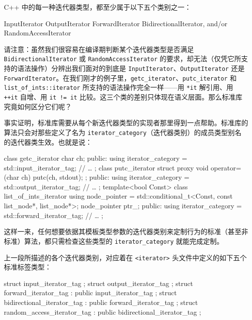 C++ 中的每一种迭代器类型，都至少属于以下五个类别之一：

\begin{codebox}[cpp]
InputIterator
OutputIterator
ForwardIterator
BidirectionalIterator, and/or
RandomAccessIterator
\end{codebox}

请注意：虽然我们很容易在编译期判断某个迭代器类型是否满足 \texttt{Bidirectional\allowbreak{}Iterator} 或 \texttt{Random\allowbreak{}Access\allowbreak{}Iterator} 的要求，却无法（仅凭它所支持的语法操作）分辨出我们面对的到底是 \texttt{Input\allowbreak{}Iterator}、\texttt{Output\allowbreak{}Iterator} 还是 \texttt{Forward\allowbreak{}Iterator}。在我们刚才的例子里，\texttt{getc\_\allowbreak{}iterator}、\texttt{putc\_\allowbreak{}iterator} 和 \texttt{list\_\allowbreak{}of\_\allowbreak{}ints::\allowbreak{}iterator} 所支持的语法操作完全一样——用 \texttt{*it} 解引用、用 \texttt{++it} 自增、用 \texttt{it != it} 比较。这三个类的差别只体现在语义层面。那么标准库究竟如何区分它们呢？

事实证明，标准库需要从每个新迭代器类型的实现者那里得到一点帮助。标准库的算法只会对那些定义了名为 \texttt{iterator\_\allowbreak{}category}（迭代器类别）的成员类型别名的迭代器类生效。也就是说：

\begin{codebox}[cpp]
    class getc_iterator {
      char ch;
    public:
      using iterator_category = std::input_iterator_tag;
      // …
    };
    class putc_iterator {
      struct proxy {
        void operator= (char ch) { putc(ch, stdout); }
      };
    public:
      using iterator_category = std::output_iterator_tag;
      // …
    };
    template<bool Const>
    class list_of_ints_iterator {
      using node_pointer = std::conditional_t<Const, const list_node*,
       list_node*>;
      node_pointer ptr_;
    public:
      using iterator_category = std::forward_iterator_tag;
      // …
    };
\end{codebox}

这样一来，任何想要依据其模板类型参数的迭代器类别来定制行为的标准（甚至非标准）算法，都只需检查这些类型的 \texttt{iterator\_\allowbreak{}category} 就能完成定制。

上一段所描述的各个迭代器类别，对应着在 \texttt{<iterator>\allowbreak{}} 头文件中定义的如下五个标准标签类型：

\begin{codebox}[cpp]
    struct input_iterator_tag { };
    struct output_iterator_tag { };
    struct forward_iterator_tag : public input_iterator_tag { };
    struct bidirectional_iterator_tag : public forward_iterator_tag { };
    struct random_access_iterator_tag : public bidirectional_iterator_tag
    { };
\end{codebox}

